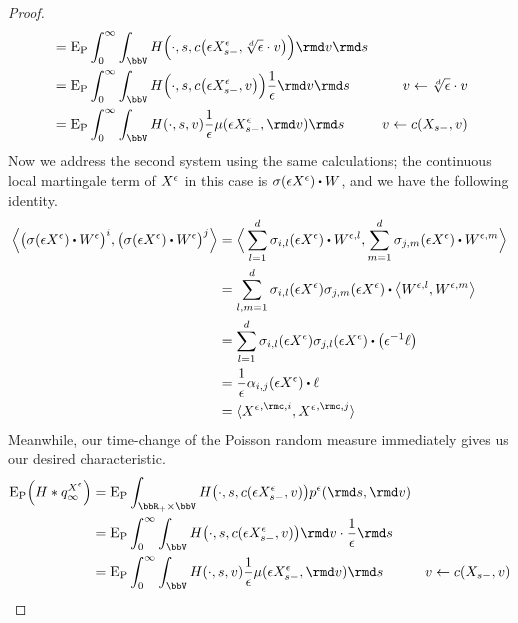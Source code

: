 \begin{proof}
\begin{align*}
    &= \Exp_\Prb \int_0^\infty \int_\vecSpace H\Big(\cdot, s, \thinner\big(\Xe_{s-}, \sqrt[d]{\epsilon} \cdot \markVar\big) \Big) \rmd\markVar\rmd s \\
    &= \Exp_\Prb \int_0^\infty \int_\vecSpace H\Big(\cdot, s, \thinner\big(\Xe_{s-}, \markVar\big) \Big) \frac1\epsilon \rmd\markVar \rmd s & \markVar \leftarrow \sqrt[d]{\epsilon} \cdot \markVar \\
    &= \Exp_\Prb \int_0^\infty \int_\vecSpace H(\cdot, s, \markVar) \frac1\epsilon \affJump(\Xe_{s-}, \rmd\markVar) \rmd s & \markVar \leftarrow \thinner(\X_{s-}, \markVar) \\
  \end{align*}
  Now we address the second system using the same calculations; the continuous local martingale term of $X^\epsilon$ in this case is $\affDiffSqrt(\Xe)\shortInt\W$, and we have the following identity.
  \begin{align*}
    \Bprj{\big(\affDiffSqrt(\Xe) \shortInt \W^\epsilon\big)^i}{\big(\affDiffSqrt(\Xe) \shortInt\W^\epsilon\big)^j}
    &= \Bprj{\sum_{l=1}^d \affDiffSqrt_{i,l}(\Xe) \shortInt\W^{\epsilon,l}}{\sum_{m=1}^d \affDiffSqrt_{j,m}(\Xe) \shortInt\W^{\epsilon,m}} \\
    &= \sum_{l,m=1}^d \affDiffSqrt_{i,l}(\Xe)\affDiffSqrt_{j,m}(\Xe) \shortInt \bprj{\W^{\epsilon,l}}{\W^{\epsilon,m}} \\
    &= \sum_{l=1}^d \affDiffSqrt_{i,l}(\Xe)\affDiffSqrt_{j,l}(\Xe) \shortInt \big( \epsilon^{-1} \leb \big) \\
    &= \frac1\epsilon \affDiff_{i,j}(\Xe) \shortInt \leb \\
    &= \prj{{\Xee}^{,\rmc,i}}{{\Xee}^{,\rmc,j}}
  \end{align*}
  Meanwhile, our time-change of the Poisson random measure immediately gives us our desired characteristic.
  \begin{align*}
    \Exp_\Prb\Big( H \ast \jumpMeas^{\Xee}_\infty \Big)
    &= \Exp_\Prb \int_{\bbR_+\times\vecSpace} H\big(\cdot, s, \thinner(\Xe_{s-}, \markVar) \big) \poisRM^\epsilon(\rmd s, \rmd\markVar) \\
    &= \Exp_\Prb \int_0^\infty \int_\vecSpace H\big(\cdot, s, \thinner(\Xe_{s-}, \markVar) \big) \rmd\markVar \cdot \frac1\epsilon \rmd s \\
    &= \Exp_\Prb \int_0^\infty \int_\vecSpace H(\cdot, s, \markVar) \frac1\epsilon \affJump(\Xe_{s-}, \rmd\markVar) \rmd s & \markVar \leftarrow \thinner(\X_{s-}, \markVar) \\
  \end{align*}

\end{proof}
